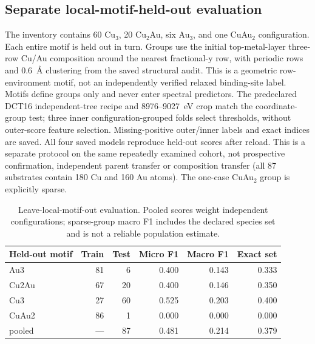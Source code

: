 \subsection{Separate local-motif-held-out evaluation}
The inventory contains 60 Cu$_3$, 20 Cu$_2$Au, six Au$_3$, and one CuAu$_2$ configuration. Each entire motif is held out in turn. Groups use the initial top-metal-layer three-row Cu/Au composition around the nearest fractional-y row, with periodic rows and 0.6~\AA{} clustering from the saved structural audit. This is a geometric row-environment motif, not an independently verified relaxed binding-site label. Motifs define groups only and never enter spectral predictors. The predeclared DCT16 independent-tree recipe and 8976--9027~eV crop match the coordinate-group test; three inner configuration-grouped folds select thresholds, without outer-score feature selection. Missing-positive outer/inner labels and exact indices are saved. All four saved models reproduce held-out scores after reload. This is a separate protocol on the same repeatedly examined cohort, not prospective confirmation, independent parent transfer or composition transfer (all 87 substrates contain 180 Cu and 160 Au atoms). The one-case CuAu$_2$ group is explicitly sparse.
\begin{table}[htbp]\centering\small\begin{tabular}{lrrrrr}\toprule Held-out motif & Train & Test & Micro F1 & Macro F1 & Exact set\\\midrule
Au3 & 81 & 6 & 0.400 & 0.143 & 0.333\\
Cu2Au & 67 & 20 & 0.400 & 0.146 & 0.350\\
Cu3 & 27 & 60 & 0.525 & 0.203 & 0.400\\
CuAu2 & 86 & 1 & 0.000 & 0.000 & 0.000\\
pooled & --- & 87 & 0.481 & 0.214 & 0.379\\
\bottomrule\end{tabular}\caption{Leave-local-motif-out evaluation. Pooled scores weight independent configurations; sparse-group macro F1 includes the declared species set and is not a reliable population estimate.}\end{table}
